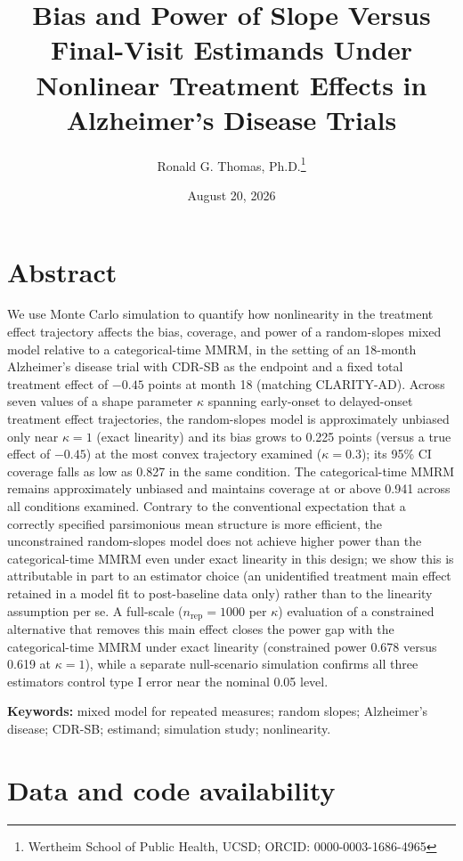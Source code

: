 \documentclass[
  11pt,
]{article}
\title{Bias and Power of Slope Versus Final-Visit Estimands Under Nonlinear Treatment Effects in Alzheimer's Disease Trials}
\author{Ronald G. Thomas, Ph.D.\thanks{Wertheim School of Public Health, UCSD; ORCID: 0000-0003-1686-4965}}
\date{August 20, 2026}
\begin{document}
\maketitle

{
\setcounter{tocdepth}{2}
\tableofcontents
}
\section*{Abstract}\label{abstract}

We use Monte Carlo simulation to quantify how nonlinearity in
the treatment effect trajectory affects the bias, coverage,
and power of a random-slopes mixed model relative to a
categorical-time MMRM, in the setting of an 18-month
Alzheimer's disease trial with CDR-SB as the endpoint and a
fixed total treatment effect of \(-0.45\) points at month 18
(matching CLARITY-AD). Across seven values of a shape
parameter \(\kappa\) spanning early-onset to delayed-onset
treatment effect trajectories, the random-slopes model is
approximately unbiased only near \(\kappa = 1\) (exact
linearity) and its bias grows to
0.225
points (versus a true effect of \(-0.45\)) at the most convex
trajectory examined (\(\kappa = 0.3\));
its 95\% CI coverage falls as low as
0.827 in the same
condition. The categorical-time MMRM remains approximately
unbiased and maintains coverage at or above
0.941 across all
conditions examined. Contrary to the conventional expectation
that a correctly specified parsimonious mean structure is more
efficient, the unconstrained random-slopes model does not
achieve higher power than the categorical-time MMRM even under
exact linearity in this design; we show this is attributable in
part to an estimator choice (an unidentified treatment main
effect retained in a model fit to post-baseline data only)
rather than to the linearity assumption per se. A full-scale
(\(n_{\mathrm{rep}} = 1000\) per \(\kappa\)) evaluation of a
constrained alternative that removes this main effect
closes the power gap with the categorical-time MMRM under exact linearity
(constrained power
0.678 versus
0.619 at
\(\kappa = 1\)), while a separate null-scenario simulation
confirms all three estimators control type I error near the
nominal 0.05 level.

\textbf{Keywords:} mixed model for repeated measures; random
slopes; Alzheimer's disease; CDR-SB; estimand; simulation
study; nonlinearity.

\section*{Data and code availability}\label{data-and-code-availability}
\end{document}
